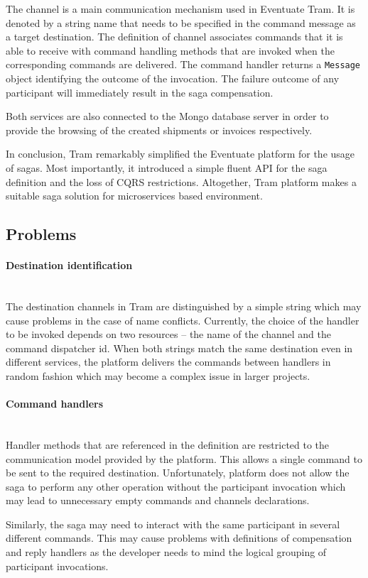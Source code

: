 \documentclass[oneside,
  digital, %
  table,   %
  nolof,     %
  nolot,     %
]{fithesis3}
\newcommand{\newlinepar}[1]{\paragraph{#1}\needspace{4\baselineskip}\mbox{}\\}
\begin{document}
The channel is a main communication mechanism used in Eventuate Tram. It is denoted by a string name that needs to be specified in the command message as a target destination. The definition of channel associates commands that it is able to receive with command handling methods that are invoked when the corresponding commands are delivered. The command handler returns a \texttt{Message} object identifying the outcome of the invocation. The failure outcome of any participant will immediately result in the saga compensation.

Both services are also connected to the Mongo database server in order to provide the browsing of the created shipments or invoices respectively.

In conclusion, Tram remarkably simplified the Eventuate platform for the usage of sagas. Most importantly, it introduced a simple fluent API for the saga definition and the loss of CQRS restrictions. Altogether, Tram platform makes a suitable saga solution for microservices based environment.

\subsection{Problems}

\newlinepar{Destination identification}

The destination channels in Tram are distinguished by a simple string which may cause problems in the case of name conflicts. Currently, the choice of the handler to be invoked depends on two resources -- the name of the channel and the command dispatcher id. When both strings match the same destination even in different services, the platform delivers the commands between handlers in random fashion which may become a complex issue in larger projects.

\newlinepar{Command handlers}

Handler methods that are referenced in the definition are restricted to the communication model provided by the platform. This allows a single command to be sent to the required destination. Unfortunately, platform does not allow the saga to perform any other operation without the participant invocation which may lead to unnecessary empty commands and channels declarations. 

Similarly, the saga may need to interact with the same participant in several different commands. This may cause problems with definitions of compensation and reply handlers as the developer needs to mind the logical grouping of participant invocations.
\end{document}
